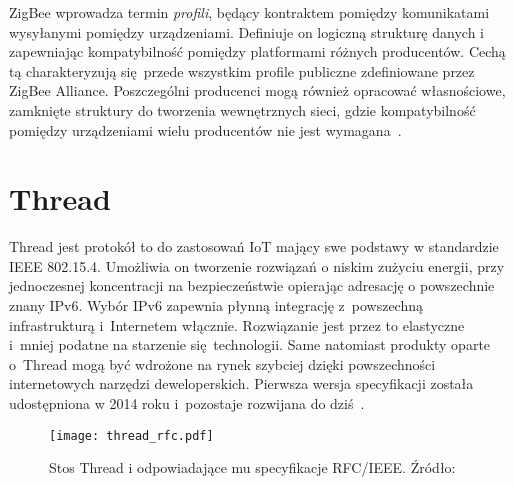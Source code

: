ZigBee wprowadza termin \textit{profili}, będący kontraktem pomiędzy komunikatami wysyłanymi pomiędzy urządzeniami. Definiuje on
logiczną strukturę danych i zapewniając kompatybilność pomiędzy platformami różnych producentów. Cechą tą charakteryzują
się przede wszystkim profile publiczne zdefiniowane przez ZigBee Alliance. Poszczególni producenci mogą 
również opracować własnościowe, zamknięte struktury do tworzenia wewnętrznych sieci, gdzie kompatybilność pomiędzy
urządzeniami wielu producentów nie jest wymagana~\cite{zigbee_alliance_zigbee_2017, stmicroelectronics_an5506_2020, zigbee_alliance_zigbee_2017}.

\section{Thread}
Thread jest protokół to do zastosowań \gls{IoT} mający swe podstawy w standardzie IEEE 802.15.4.
Umożliwia on tworzenie rozwiązań o niskim zużyciu energii, przy jednoczesnej koncentracji na bezpieczeństwie opierając
adresację o powszechnie znany IPv6. Wybór IPv6 zapewnia płynną integrację z~powszechną infrastrukturą
i~Internetem włącznie. Rozwiązanie jest przez to elastyczne i~mniej podatne na starzenie się technologii.
Same natomiast produkty oparte o~Thread mogą być wdrożone na rynek szybciej dzięki powszechności
internetowych narzędzi deweloperskich. Pierwsza wersja specyfikacji została udostępniona
w 2014 roku i~pozostaje rozwijana do dziś~\cite{noauthor_thread_nodate}.

\begin{figure}[!ht]
	\centering \texttt{[image: thread\_rfc.pdf]}
	\caption{Stos Thread i odpowiadające mu specyfikacje RFC/IEEE. Źródło:~\cite{silicon_laboratories_ug10311_2022}}
	\label{rys:thread_stack_overview_ug10311}
\end{figure}


